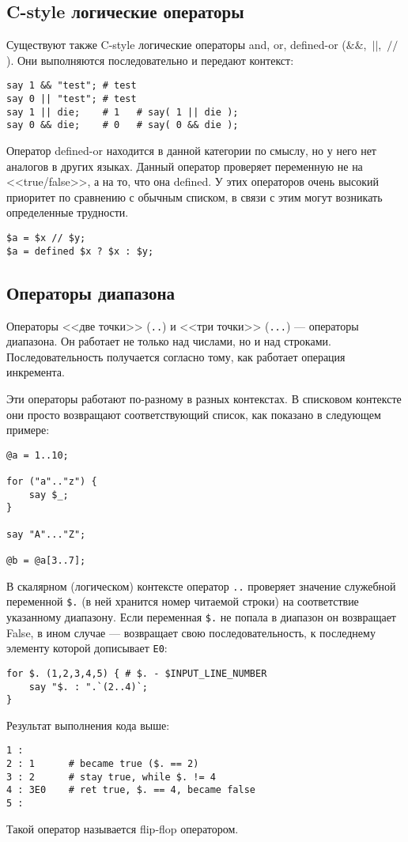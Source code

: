 \subsection{C-style логические операторы}
Существуют также C-style логические операторы and, or, defined-or ($\&\&$,~$||$,~$//$).
Они выполняются последовательно и передают контекст:
\begin{verbatim}
say 1 && "test"; # test
say 0 || "test"; # test
say 1 || die;    # 1   # say( 1 || die );
say 0 && die;    # 0   # say( 0 && die );
\end{verbatim}
Оператор {defined-or} находится в данной категории по смыслу, но у него нет аналогов в других языках. Данный оператор проверяет переменную не на <<{true/false}>>, а на то, что она {defined}. У этих операторов очень высокий приоритет по сравнению с обычным списком, в связи с этим могут возникать определенные трудности.
\begin{verbatim}
$a = $x // $y;
$a = defined $x ? $x : $y;
\end{verbatim}

\subsection{Операторы диапазона}
Операторы <<две точки>> (\verb|..|) и <<три точки>> (\verb|...|) --- операторы диапазона. Он работает не только над числами, но и над строками. Последовательность получается согласно тому, как работает операция инкремента.

Эти операторы работают по-разному в разных контекстах. В списковом контексте они просто возвращают соответствующий список, как показано в следующем примере:
\begin{verbatim}
@a = 1..10;

for ("a".."z") {
    say $_;
}

say "A"..."Z";

@b = @a[3..7];
\end{verbatim}
В скалярном (логическом) контексте оператор \verb|..| проверяет значение служебной переменной \verb|$.| (в ней хранится номер читаемой строки) на соответствие указанному диапазону. Если переменная \verb|$.| не попала в диапазон он возвращает False, в ином случае --- возвращает свою последовательность, к последнему элементу которой дописывает \verb|E0|:
\begin{verbatim}
for $. (1,2,3,4,5) { # $. - $INPUT_LINE_NUMBER
    say "$. : ".`(2..4)`;
}
\end{verbatim}
Результат выполнения кода выше:
\begin{verbatim}
1 :
2 : 1      # became true ($. == 2)
3 : 2      # stay true, while $. != 4
4 : 3E0    # ret true, $. == 4, became false
5 :
\end{verbatim}
Такой оператор называется flip-flop оператором.

